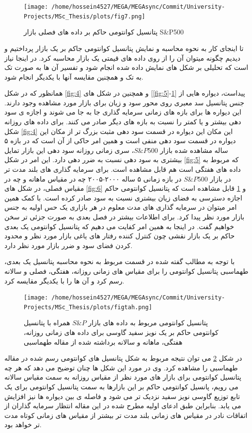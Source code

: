 \documentclass[a4paper,titlepage,12pt,fleqn,oneside]{report}
\begin{document}
	\begin{figure}[ptb]
		\centering
		\texttt{[image: /home/hossein4527/MEGA/MEGAsync/Commit/University-Projects/MSc\_Thesis/plots/fig7.png]}
		\caption{پتانسیل کوانتومی حاکم بر داده های فصلی بازار S\&P500}
		\label{fig:7}
	\end{figure}
	\newpage
	تا اینجای کار به نحوه محاسبه و نمایش پتانسیل کوانتومی جاکم بر یک بازار پرداختیم و دیدیم چگونه میتوان آن را از روی داده های قیمتی یک بازار محاسبه کرد. در اینجا نیاز است که تحلیلی بر شکل های نمایش داده شده انجام شود و تفسیر آن ها به صورت تک به تک و همچنین مقایسه آنها با یکدیگر انجام شود. 
	
	همانظور که در شکل 
	\ref{fig:4}
	و همچنین در شکل های 
	[\ref{fig:5}-\ref{fig:7}]
	پیداست، دیواره  هایی از جنس پتانسیل سد معبری روی محور سود و زیان برای بازار مورد مشاهده وجود دارند.  این دیواره ها برای بازه های زمانی سرمایه گذاری جا به جا می شوند و اجازه ی سود دهی بیشتر و یا کمتر را نسبت به بازه های دیگر صادر می کنند. برای داده های روزانه شکل
	\ref{fig:4}
	این مکان این دیواره در قسمت سود دهی مثبت بزرگ تر از مکان این دیواره در قسمت سود دهی منفی است و همین امر حاکی از آن است که در بازه ۵ ساله مشاهده شده بازار
	$S\&P500$، 
	سری زمانی روزانه سود دهی این بازار تمایل بیشتری به سود دهی نسبت به ضرر دهی دارد. این امر در شکل 
	\ref{fig:5}
	که مربوط به داده های هفتگی است هم قابل مشاهده است. برای سرمایه گذاری های بلند مدت تر در بازار 
	$S\&P500$
	در بازه زمانی ۵ ساله ۲۰۰۰-۲۰۰۵ چه در مقیاس ماهانه و چه در مقیاس فصلی، در شکل های 
	\ref{fig:6}
	و 
	\ref{fig:7}
	قابل مشاهده است که پتانسیل کوانتومی حاکم اجازه دسترسی به فضای زیان بیشتری نسبت به سود صادر کرده است.
	با کمک همین امر میتوان در سرمایه گذاری های مدت معلوم در هر بازاری یک حس اولیه به جنس بازار مورد نظر پیدا کرد. برای اطلاعات بیشتر در فصل بعدی به صورت جزئی تر سخن خواهیم گفت. در اینجا به همین امر کفایت می دهیم که پتانسیل کوانتومی یک بعدی حاکم بر یک بازار نقشی چون کنترل کننده رفتار های یاغی بازار مورد نظر و محدود کردن فضای سود و ضرر بازار مورد نظر دارد.
	
	با توجه به مطالب گفته شده در قسمت مربوط به نحوه محاسبه پتانسیل یک بعدی، طهماسبی پتانسیل کوانتومی را برای مقیاس های زمانی روزانه، هفتگی، فصلی و سالانه رسم کرد و آن ها را با یکدیگر مقایسه کرد.
	\begin{figure}[ptb]
		\centering
		\texttt{[image: /home/hossein4527/MEGA/MEGAsync/Commit/University-Projects/MSc\_Thesis/plots/figtah.png]}
		\caption{پتانسیل کوانتومی مربوط به داده های بازار 
			$S\&P$
			همراه با پتانسیل کوانتومی حاکم بر یک نویز سفید گاوسی برای داده های زمانی روزانه، هفتگی، ماهانه و سالانه
			برداشته شده از مقاله طهماسبی \cite{tahmaseb}
		}
		\label{fig:8}
	\end{figure}
	در شکل 
	\ref{fig:8}
	می توان نتیجه مربوط به شکل پتانسیل های کوانتومی رسم شده در مقاله طهماسبی را مشاهده کرد.  وی در مورد این شکل ها چنان توضیح می دهد که هر چه پتانسیل کوانتومی برای بازار های مورد نظر از مقیاس روزانه به سمت مقیاس سالانه می رویم، پانسیل کوانتومی حاکم بر این بازارها به سمت پتانسیل کوانتومی برای یک تابع توزیع گاوسی نویز سفید نزدیک تر می شود و فاصله ی بین دیواره ها نیز افزایش می یابد. بنابراین طبق ادعای اولیه مطرح شده در این مقاله انتظار سرمایه گذاران از اتفاقات نادر در مقیاس های زمانی بلند مدت تر بیشتر از مقیاس های زمانی کوتاه مدت تر خواهد بود. 
	
\end{document}

